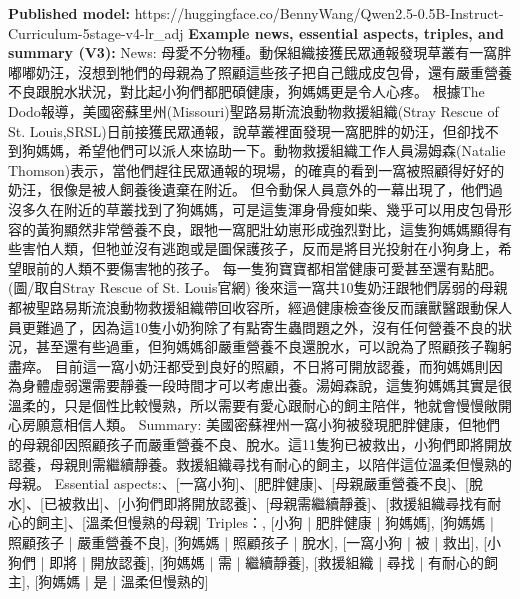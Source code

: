 \documentclass[preprint,12pt]{elsarticle}
\begin{document}
\noindent
\textbf{Published model:}\newline
{
  \footnotesize
  https://huggingface.co/BennyWang/Qwen2.5-0.5B-Instruct-Curriculum-5stage-v4-lr\_adj
}
\newline
\newline
\noindent
\textbf{Example news, essential aspects, triples, and summary (V3):}\newline
{
\small
\noindent
News:\newline
母愛不分物種。動保組織接獲民眾通報發現草叢有一窩胖嘟嘟奶汪，沒想到牠們的母親為了照顧這些孩子把自己餓成皮包骨，還有嚴重營養不良跟脫水狀況，對比起小狗們都肥碩健康，狗媽媽更是令人心疼。\newline
根據The Dodo報導，美國密蘇里州(Missouri)聖路易斯流浪動物救援組織(Stray Rescue of St. Louis,SRSL)日前接獲民眾通報，說草叢裡面發現一窩肥胖的奶汪，但卻找不到狗媽媽，希望他們可以派人來協助一下。動物救援組織工作人員湯姆森(Natalie Thomson)表示，當他們趕往民眾通報的現場，的確真的看到一窩被照顧得好好的奶汪，很像是被人飼養後遺棄在附近。\newline
但令動保人員意外的一幕出現了，他們過沒多久在附近的草叢找到了狗媽媽，可是這隻渾身骨瘦如柴、幾乎可以用皮包骨形容的黃狗顯然非常營養不良，跟牠一窩肥壯幼崽形成強烈對比，這隻狗媽媽顯得有些害怕人類，但牠並沒有逃跑或是圖保護孩子，反而是將目光投射在小狗身上，希望眼前的人類不要傷害牠的孩子。\newline
每一隻狗寶寶都相當健康可愛甚至還有點肥。 (圖/取自Stray Rescue of St. Louis官網)\newline
後來這一窩共10隻奶汪跟牠們孱弱的母親都被聖路易斯流浪動物救援組織帶回收容所，經過健康檢查後反而讓獸醫跟動保人員更難過了，因為這10隻小奶狗除了有點寄生蟲問題之外，沒有任何營養不良的狀況，甚至還有些過重，但狗媽媽卻嚴重營養不良還脫水，可以說為了照顧孩子鞠躬盡瘁。\newline
目前這一窩小奶汪都受到良好的照顧，不日將可開放認養，而狗媽媽則因為身體虛弱還需要靜養一段時間才可以考慮出養。湯姆森說，這隻狗媽媽其實是很溫柔的，只是個性比較慢熟，所以需要有愛心跟耐心的飼主陪伴，牠就會慢慢敞開心房願意相信人類。\newline
\newline
Summary:\newline
美國密蘇裡州一窩小狗被發現肥胖健康，但牠們的母親卻因照顧孩子而嚴重營養不良、脫水。這11隻狗已被救出，小狗們即將開放認養，母親則需繼續靜養。救援組織尋找有耐心的飼主，以陪伴這位溫柔但慢熟的母親。\newline
\newline
Essential aspects:\newline
[美國密蘇裡州]、[一窩小狗]、[肥胖健康]、[母親嚴重營養不良]、[脫水]、[已被救出]、[小狗們即將開放認養]、[母親需繼續靜養]、[救援組織尋找有耐心的飼主]、[溫柔但慢熟的母親]\newline
\newline
Triples：, [小狗 | 肥胖健康 | 狗媽媽], [狗媽媽 | 照顧孩子 | 嚴重營養不良], [狗媽媽 | 照顧孩子 | 脫水], [一窩小狗 | 被 | 救出], [小狗們 | 即將 | 開放認養], [狗媽媽 | 需 | 繼續靜養], [救援組織 | 尋找 | 有耐心的飼主], [狗媽媽 | 是 | 溫柔但慢熟的]\newline
\newline
}
\end{document}
